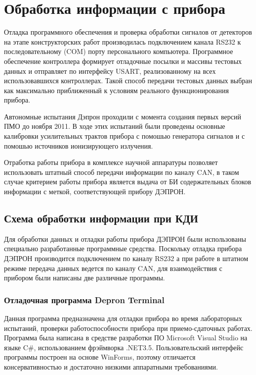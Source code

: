 \chapter{Обработка информации с прибора} \label{chapt3}


Отладка программного обеспечения и проверка обработки сигналов от детекторов на этапе  конструкторских работ производилась подключением канала RS232 к последовательному (COM) порту персонального компьютера. Программное обеспечение контроллера формирует отладочные посылки и массивы тестовых данных и отправляет по интерфейсу USART, реализованному на всех использовавшихся контроллерах. Такой способ передачи тестовых данных выбран как максимально приближенный к условиям реального функционирования прибора. 

Автономные испытания Дэпрон проходили с момента создания первых версий ПМО до ноября 2011. В ходе этих испытаний были проведены основные калибровки усилительных трактов прибора с помошью генератора сигналов и с помошью  источников ионизирующего излучения.

Отработка работы прибора в комплексе научной аппаратуры позволяет использовать штатный способ передачи информации по каналу CAN, в таком случае критерием работы прибора является выдача от БИ содержательных блоков информации с меткой, соответствующей прибору ДЭПРОН. 

\section{Схема обработки информации при КДИ}\label{sec3.1}

Для обработки данных и отладки работы прибора ДЭПРОН были использованы специально разработанные программные средства. Поскольку отладка прибора ДЭПРОН производится подключением по каналу RS232 а при работе в штатном режиме передача данных ведется по каналу CAN, для взаимодействия с прибором были написаны две различные программы.

\subsection{Отладочная программа Depron Terminal}

Данная программа предназначена для отладки прибора во время лабораторных испытаний, проверки работоспособности прибора при приемо-сдаточных работах. Программа была написана в средстве разработки ПО Microsoft Visual Studio на языке C\#,   использованием фрэймворка .NET3.5. Пользовательский интерфейс программы построен на основе WinForms, поэтому отличается консервативностью и достаточно низкими аппаратными требованиями.

